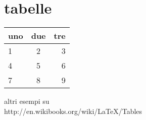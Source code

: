 \documentclass[a4paper]{article}
\begin{document}
\section{tabelle}


\begin{tabular}{ l c r }
 uno & due & tre \\
  \hline
  1 & 2 & 3 \\
  4 & 5 & 6 \\
  7 & 8 & 9 \\
\end{tabular}


altri esempi su \\
http://en.wikibooks.org/wiki/LaTeX/Tables \\
\end{document}
